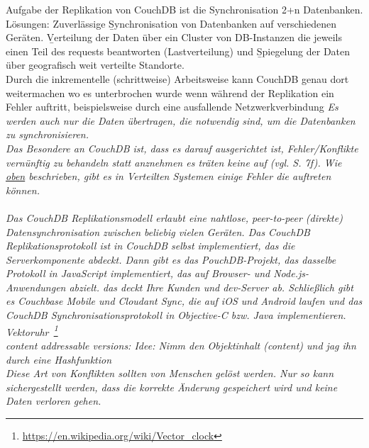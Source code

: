
Aufgabe der Replikation von CouchDB ist die Synchronisation 2+n Datenbanken. Lösungen: Zuverlässige \b{Synchronisation} von Datenbanken auf verschiedenen Geräten. \b{Verteilung} der Daten über ein Cluster von DB-Instanzen die jeweils einen Teil des requests beantworten (Lastverteilung) und \b{Spiegelung} der Daten über geografisch weit verteilte Standorte.\\
Durch die inkrementelle (schrittweise) Arbeitsweise kann CouchDB genau dort weitermachen wo es unterbrochen wurde wenn während der Replikation ein Fehler auftritt, beispielsweise durch eine ausfallende Netzwerkverbindung
\it{Es werden auch nur die Daten übertragen, die notwendig sind, um die Datenbanken zu synchronisieren.}\\
Das Besondere an CouchDB ist, dass es darauf ausgerichtet ist, Fehler/Konflikte vernünftig zu behandeln statt anznehmen es träten keine auf (vgl. \cite{couchDB} S. 7f). Wie \hyperref[sec:conflict]{oben} beschrieben, gibt es in Verteilten Systemen einige Fehler die auftreten können.\\\\
\it{Das CouchDB Replikationsmodell erlaubt eine nahtlose, peer-to-peer (direkte) Datensynchronisation zwischen beliebig vielen Geräten. Das CouchDB Replikationsprotokoll ist in CouchDB selbst implementiert, das die Serverkomponente abdeckt. Dann gibt es das PouchDB-Projekt, das dasselbe Protokoll in JavaScript implementiert, das auf Browser- und Node.js-Anwendungen abzielt. das deckt Ihre Kunden und dev-Server ab. Schließlich gibt es Couchbase Mobile und Cloudant Sync, die auf iOS und Android laufen und das CouchDB Synchronisationsprotokoll in Objective-C bzw. Java implementieren.}\\
Vektoruhr~\footnote{\url{https://en.wikipedia.org/wiki/Vector_clock}} \\
content addressable versions: Idee: Nimm den Objektinhalt (content) und jag ihn durch eine \gls{Hashfunktion}\\
%
Diese Art von Konflikten sollten von Menschen gelöst werden. Nur so kann sichergestellt werden, dass die korrekte Änderung gespeichert wird und keine Daten verloren gehen.
%

